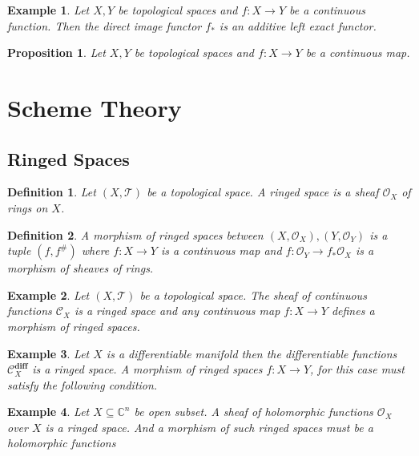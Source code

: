 \documentclass{article}
\newtheorem{proposition}{Proposition}[section]
\newtheorem{definition}{Definition}[section]
\newtheorem{example}{Example}[section]
\numberwithin{equation}{section}
\begin{document}
\begin{example}
Let $X,Y$ be topological spaces and $f:X\to Y$ be a continuous function. Then the direct image functor $f_*$ is an additive left exact functor. %
\end{example}

\begin{proposition}
Let $X,Y$ be topological spaces and $f:X\to Y$ be a continuous map. 
\end{proposition}

\section{Scheme Theory}

\subsection{Ringed Spaces}

\begin{definition}
Let $(X,\mathcal{T})$ be a topological space. A ringed space is a sheaf $\mathcal{O}_X$ of rings on $X$. 
\end{definition}

\begin{definition}
A morphism of ringed spaces between $(X,\mathcal{O}_X),(Y,\mathcal{O}_Y)$ is a tuple $(f,f^{\#})$ where $f:X\to Y$ is a continuous map and $f:\mathcal{O}_Y\to f_*\mathcal{O}_X$ is a morphism of sheaves of rings. 
\end{definition}

\begin{example}
Let $(X,\mathcal{T})$ be a topological space. The sheaf of continuous functions $\mathcal{C}_X$ is a ringed space and any continuous map $f:X\to Y$ defines a morphism of ringed spaces.

\end{example}
\begin{example}
Let $X$ is a differentiable manifold then the differentiable functions $\mathcal{C}^{\mathbf{diff}}_X$ is a ringed space. A morphism of ringed spaces $f:X\to Y$, for this case must satisfy the following condition.
\end{example}

\begin{example}
Let $X\subseteq\mathbb{C}^n$ be open subset. A sheaf of holomorphic functions $\mathcal{O}_X$ over $X$ is a ringed space. And a morphism of such ringed spaces must be a holomorphic functions
\end{example}
\end{document}
